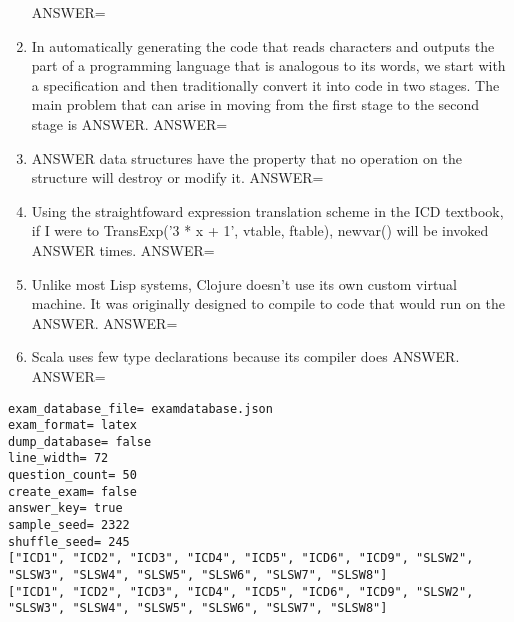 \documentclass{exam}
\begin{document}
\begin{enumerate}
ANSWER=
\item In automatically generating the code that reads characters and outputs the part of a programming language that is analogous to its words, we start with a specification and then traditionally convert it into code in two stages.  The main problem that can arise in moving from the first stage to the second stage is ANSWER.\newline
ANSWER=
\item ANSWER data structures have the property that no operation on the structure will destroy or modify it.\newline
ANSWER=
\item Using the straightfoward expression translation scheme in the ICD textbook, if I were to TransExp('3 * x + 1', vtable, ftable), newvar() will be invoked ANSWER times.\newline
ANSWER=
\item Unlike most Lisp systems, Clojure doesn't use its own custom virtual machine.  It was originally designed to compile to code that would run on the ANSWER.\newline
ANSWER=
\item Scala uses few type declarations because its compiler does ANSWER.\newline
ANSWER=
\end{enumerate}
\newpage
\begin{verbatim}
exam_database_file= examdatabase.json
exam_format= latex
dump_database= false
line_width= 72
question_count= 50
create_exam= false
answer_key= true
sample_seed= 2322
shuffle_seed= 245
["ICD1", "ICD2", "ICD3", "ICD4", "ICD5", "ICD6", "ICD9", "SLSW2",
"SLSW3", "SLSW4", "SLSW5", "SLSW6", "SLSW7", "SLSW8"]
["ICD1", "ICD2", "ICD3", "ICD4", "ICD5", "ICD6", "ICD9", "SLSW2",
"SLSW3", "SLSW4", "SLSW5", "SLSW6", "SLSW7", "SLSW8"]
\end{verbatim}
\end{document}
